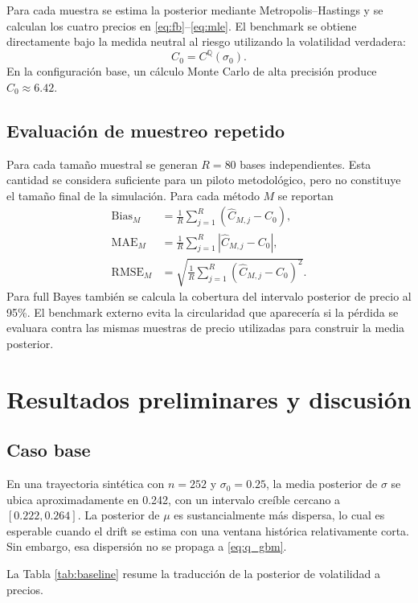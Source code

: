 \documentclass[12pt,letterpaper]{article}
\newcommand{\Qmeasure}{\mathbb{Q}}
\newcommand{\RMSE}{\operatorname{RMSE}}
\newcommand{\MAE}{\operatorname{MAE}}
\newcommand{\Bias}{\operatorname{Bias}}
\begin{document}
Para cada muestra se estima la posterior mediante Metropolis--Hastings y se calculan los cuatro precios en \eqref{eq:fb}--\eqref{eq:mle}. El benchmark se obtiene directamente bajo la medida neutral al riesgo utilizando la volatilidad verdadera:
\begin{equation}
 C_0=C^{\Qmeasure}(\sigma_0).
 \label{eq:trueprice}
\end{equation}
En la configuración base, un cálculo Monte Carlo de alta precisión produce $C_0\approx6.42$.

\subsection{Evaluación de muestreo repetido}

Para cada tamaño muestral se generan $R=80$ bases independientes. Esta cantidad se considera suficiente para un piloto metodológico, pero no constituye el tamaño final de la simulación. Para cada método $M$ se reportan
\begin{align}
 \Bias_M
 &=\frac1R\sum_{j=1}^{R}(\widehat C_{M,j}-C_0),\\
 \MAE_M
 &=\frac1R\sum_{j=1}^{R}|\widehat C_{M,j}-C_0|,\\
 \RMSE_M
 &=\sqrt{\frac1R\sum_{j=1}^{R}(\widehat C_{M,j}-C_0)^2}.
\end{align}
Para full Bayes también se calcula la cobertura del intervalo posterior de precio al 95\%. El benchmark externo evita la circularidad que aparecería si la pérdida se evaluara contra las mismas muestras de precio utilizadas para construir la media posterior.

\section{Resultados preliminares y discusión}

\subsection{Caso base}

En una trayectoria sintética con $n=252$ y $\sigma_0=0.25$, la media posterior de $\sigma$ se ubica aproximadamente en 0.242, con un intervalo creíble cercano a $[0.222,0.264]$. La posterior de $\mu$ es sustancialmente más dispersa, lo cual es esperable cuando el drift se estima con una ventana histórica relativamente corta. Sin embargo, esa dispersión no se propaga a \eqref{eq:q_gbm}.

La Tabla \ref{tab:baseline} resume la traducción de la posterior de volatilidad a precios.
\end{document}
